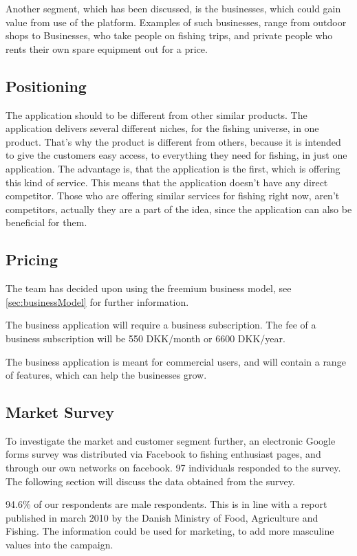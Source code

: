 Another segment, which has been discussed, is the businesses, which could gain value from use of the platform. Examples of such businesses, range from outdoor shops to Businesses, who take people on fishing trips, and private people who rents their own spare equipment out for a price.

\subsection{Positioning}
The application should to be different from other similar products. The application delivers several different niches, for the fishing universe, in one product. That's why the product is different from others, because it is intended to give the customers easy access, to everything they need for fishing, in just one application. The advantage is, that the application is the first, which is offering this kind of service. This means that the application doesn't have any direct competitor. Those who are offering similar services for fishing right now, aren't competitors, actually they are a part of the idea, since the application can also be beneficial for them.



\subsection{Pricing}
The team has decided upon using the freemium business model, see \autoref{sec:businessModel} for further information.

The business application will require a business subscription. The fee of a business subscription will be 550 DKK/month or 6600 DKK/year.

The business application is meant for commercial users, and will contain a range of features, which can help the businesses grow.



\subsection{Market Survey}
To investigate the market and customer segment further, an electronic Google forms survey was distributed via Facebook to fishing enthusiast pages, and through our own networks on facebook. 97 individuals responded to the survey. The following section will discuss the data obtained from the survey. 


94.6\% of our respondents are male respondents. This is in line with a report published in march 2010 by the Danish Ministry of Food, Agriculture and Fishing. The information could be used for marketing, to add more masculine values into the campaign.


